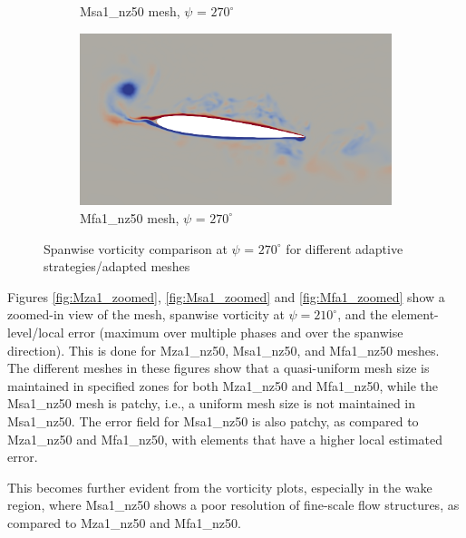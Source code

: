 \begin{figure}[H]
\begin{subfigure}[b]{0.475\textwidth}
\caption{Msa1\_nz50 mesh, $\psi$ = $270^\circ$}
\label{fig:hadapt_psi270}
\end{subfigure}
\begin{subfigure}[b]{0.475\textwidth}
\centering
\includegraphics[width=1\textwidth]{figures/adapt_strat/vorticity_plots/Mfa1_50/phase_270.png}
\caption{Mfa1\_nz50 mesh, $\psi$ = $270^\circ$}
\label{fig:FB_psi270}
\end{subfigure}
\caption{Spanwise vorticity comparison at $\psi$ = $270^\circ$ for different adaptive strategies/adapted meshes}
\label{fig:vorticity_270}
\end{figure}

Figures \ref{fig:Mza1_zoomed}, \ref{fig:Msa1_zoomed} and \ref{fig:Mfa1_zoomed} show a zoomed-in view of the mesh, spanwise vorticity at $\psi=210^\circ$, and the element-level/local error (maximum over multiple phases and over the spanwise direction). This is done for Mza1\_nz50, Msa1\_nz50, and Mfa1\_nz50 meshes.
The different meshes in these figures show that a quasi-uniform mesh size is maintained in specified zones for both Mza1\_nz50 and Mfa1\_nz50, while the Msa1\_nz50 mesh is patchy, i.e., a uniform mesh size is not maintained in Msa1\_nz50.
The error field for Msa1\_nz50 is also patchy, as compared to Mza1\_nz50 and Mfa1\_nz50, with elements that have a higher local estimated error.

This becomes further evident from the vorticity plots, especially in the wake region, where Msa1\_nz50 shows a poor resolution of fine-scale flow structures, as compared to Mza1\_nz50 and Mfa1\_nz50.


